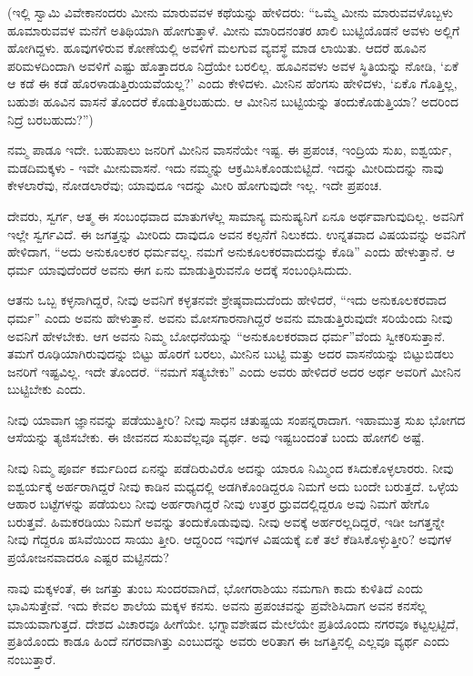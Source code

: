 (ಇಲ್ಲಿ ಸ್ವಾಮಿ ವಿವೇಕಾನಂದರು ಮೀನು ಮಾರುವವಳ ಕಥೆಯನ್ನು ಹೇಳಿದರು: “ಒಮ್ಮೆ ಮೀನು ಮಾರುವವಳೊಬ್ಬಳು ಹೂಮಾರುವವಳ ಮನೆಗೆ ಅತಿಥಿಯಾಗಿ ಹೋಗುತ್ತಾಳೆ. ಮೀನು ಮಾರಿದನಂತರ ಖಾಲಿ ಬುಟ್ಟಿಯೊಡನೆ ಅವಳು ಅಲ್ಲಿಗೆ ಹೋಗಿದ್ದಳು. ಹೂವುಗಳಿರುವ ಕೋಣೆಯಲ್ಲಿ ಅವಳಿಗೆ ಮಲಗುವ ವ್ಯವಸ್ಥೆ ಮಾಡ ಲಾಯಿತು. ಆದರೆ ಹೂವಿನ ಪರಿಮಳದಿಂದಾಗಿ ಅವಳಿಗೆ ಎಷ್ಟು ಹೊತ್ತಾದರೂ ನಿದ್ರೆಯೇ ಬರಲಿಲ್ಲ. ಹೂವಿನವಳು ಅವಳ ಸ್ಥಿತಿಯನ್ನು ನೋಡಿ, ‘ಏಕೆ ಆ ಕಡೆ ಈ ಕಡೆ ಹೊರಳಾಡುತ್ತಿರುಯವೆಯಲ್ಲ?’ ಎಂದು ಕೇಳಿದಳು. ಮೀನಿನ ಹೆಂಗಸು ಹೇಳಿದಳು, ‘ಏಕೊ ಗೊತ್ತಿಲ್ಲ, ಬಹುಶಃ ಹೂವಿನ ವಾಸನೆ ತೊಂದರೆ ಕೊಡುತ್ತಿರಬಹುದು. ಆ ಮೀನಿನ ಬುಟ್ಟಿಯನ್ನು ತಂದುಕೊಡುತ್ತಿಯಾ? ಅದರಿಂದ ನಿದ್ರೆ ಬರಬಹುದು?”)

ನಮ್ಮ ಪಾಡೂ ಇದೇ. ಬಹುಪಾಲು ಜನರಿಗೆ ಮೀನಿನ ವಾಸನೆಯೇ ಇಷ್ಟ. ಈ ಪ್ರಪಂಚ, ಇಂದ್ರಿಯ ಸುಖ, ಐಶ್ವರ್ಯ, ಮಡದಿಮಕ್ಕಳು - ಇವೇ ಮೀನುವಾಸನೆ. ಇದು ನಮ್ಮನ್ನು ಆಕ್ರಮಿಸಿಕೊಂಡುಬಿಟ್ಟಿದೆ. ಇದನ್ನು ಮೀರಿದುದನ್ನು ನಾವು ಕೇಳಲಾರೆವು, ನೋಡಲಾರೆವು; ಯಾವುದೂ ಇದನ್ನು ಮೀರಿ ಹೋಗುವುದೇ ಇಲ್ಲ. ಇದೇ ಪ್ರಪಂಚ.

ದೇವರು, ಸ್ವರ್ಗ, ಆತ್ಮ ಈ ಸಂಬಂಧವಾದ ಮಾತುಗಳೆಲ್ಲ ಸಾಮಾನ್ಯ ಮನುಷ್ಯನಿಗೆ ಏನೂ ಅರ್ಥವಾಗುವುದಿಲ್ಲ. ಅವನಿಗೆ ಇಲ್ಲೇ ಸ್ವರ್ಗವಿದೆ. ಈ ಜಗತ್ತನ್ನು ಮೀರಿದು ದಾವುದೂ ಅವನ ಕಲ್ಪನೆಗೆ ನಿಲುಕದು. ಉನ್ನತವಾದ ವಿಷಯವನ್ನು ಅವನಿಗೆ ಹೇಳಿದಾಗ, “ಅದು ಅನುಕೂಲಕರ ಧರ್ಮವಲ್ಲ. ನಮಗೆ ಅನುಕೂಲಕರವಾದುದನ್ನು ಕೊಡಿ” ಎಂದು ಹೇಳುತ್ತಾನೆ. ಆ ಧರ್ಮ ಯಾವುದೆಂದರೆ ಅವನು ಈಗ ಏನು ಮಾಡುತ್ತಿರುವನೊ ಅದಕ್ಕೆ ಸಂಬಂಧಿಸಿದುದು.

ಆತನು ಒಬ್ಬ ಕಳ್ಳನಾಗಿದ್ದರೆ, ನೀವು ಅವನಿಗೆ ಕಳ್ಳತನವೇ ಶ್ರೇಷ್ಠವಾದುದೆಂದು ಹೇಳಿದರೆ, “ಇದು ಅನುಕೂಲಕರವಾದ ಧರ್ಮ” ಎಂದು ಅವನು ಹೇಳುತ್ತಾನೆ. ಅವನು ಮೋಸಗಾರನಾಗಿದ್ದರೆ ಅವನು ಮಾಡುತ್ತಿರುವುದೇ ಸರಿಯೆಂದು ನೀವು ಅವನಿಗೆ ಹೇಳಬೇಕು. ಆಗ ಅವನು ನಿಮ್ಮ ಬೋಧನೆಯನ್ನು “ಅನುಕೂಲಕರವಾದ ಧರ್ಮ”ವೆಂದು ಸ್ವೀಕರಿಸುತ್ತಾನೆ. ತಮಗೆ ರೂಢಿಯಾಗಿರುವುದನ್ನು ಬಿಟ್ಟು ಹೊರಗೆ ಬರಲು, ಮೀನಿನ ಬುಟ್ಟಿ ಮತ್ತು ಅದರ ವಾಸನೆಯನ್ನು ಬಿಟ್ಟುಬಿಡಲು ಜನರಿಗೆ ಇಷ್ಟವಿಲ್ಲ. ಇದೇ ತೊಂದರೆ. “ನಮಗೆ ಸತ್ಯಬೇಕು” ಎಂದು ಅವರು ಹೇಳಿದರೆ ಅದರ ಅರ್ಥ ಅವರಿಗೆ ಮೀನಿನ ಬುಟ್ಟಿಬೇಕು ಎಂದು.

ನೀವು ಯಾವಾಗ ಜ್ಞಾನವನ್ನು ಪಡೆಯುತ್ತೀರಿ? ನೀವು ಸಾಧನ ಚತುಷ್ಟಯ ಸಂಪನ್ನರಾದಾಗ. ಇಹಾಮುತ್ರ ಸುಖ ಭೋಗದ ಆಸೆಯನ್ನು ತ್ಯಜಿಸಬೇಕು. ಈ ಜೀವನದ ಸುಖವೆಲ್ಲವೂ ವ್ಯರ್ಥ. ಅವು ಇಷ್ಟಬಂದಂತೆ ಬಂದು ಹೋಗಲಿ ಅಷ್ಟೆ.

ನೀವು ನಿಮ್ಮ ಪೂರ್ವ ಕರ್ಮದಿಂದ ಏನನ್ನು ಪಡೆದಿರುವಿರೊ ಅದನ್ನು ಯಾರೂ ನಿಮ್ಮಿಂದ ಕಸಿದುಕೊಳ್ಳಲಾರರು. ನೀವು ಐಶ್ವರ್ಯಕ್ಕೆ ಅರ್ಹರಾಗಿದ್ದರೆ ನೀವು ಕಾಡಿನ ಮಧ್ಯದಲ್ಲಿ ಅಡಗಿಕೊಂಡಿದ್ದರೂ ನಿಮಗೆ ಅದು ಬಂದೇ ಬರುತ್ತದೆ. ಒಳ್ಳೆಯ ಆಹಾರ ಬಟ್ಟೆಗಳನ್ನು ಪಡೆಯಲು ನೀವು ಅರ್ಹರಾಗಿದ್ದರೆ ನೀವು ಉತ್ತರ ಧ್ರುವದಲ್ಲಿದ್ದರೂ ಅವು ನಿಮಗೆ ಹೇಗೊ ಬರುತ್ತವೆ. ಹಿಮಕರಡಿಯು ನಿಮಗೆ ಅವನ್ನು ತಂದುಕೊಡುವುವು. ನೀವು ಅವಕ್ಕೆ ಅರ್ಹರಲ್ಲದಿದ್ದರೆ, ಇಡೀ ಜಗತ್ತನ್ನೇ ನೀವು ಗೆದ್ದರೂ ಹಸಿವೆಯಿಂದ ಸಾಯು ತ್ತೀರಿ. ಆದ್ದರಿಂದ ಇವುಗಳ ವಿಷಯಕ್ಕೆ ಏಕೆ ತಲೆ ಕೆಡಿಸಿಕೊಳ್ಳುತ್ತೀರಿ? ಅವುಗಳ ಪ್ರಯೋಜನವಾದರೂ ಎಷ್ಟರ ಮಟ್ಟಿನದು?

ನಾವು ಮಕ್ಕಳಂತೆ, ಈ ಜಗತ್ತು ತುಂಬ ಸುಂದರವಾಗಿದೆ, ಭೋಗರಾಶಿಯು ನಮಗಾಗಿ ಕಾದು ಕುಳಿತಿದೆ ಎಂದು ಭಾವಿಸುತ್ತೇವೆ. ಇದು ಕೇವಲ ಶಾಲೆಯ ಮಕ್ಕಳ ಕನಸು. ಅವನು ಪ್ರಪಂಚವನ್ನು ಪ್ರವೇಶಿಸಿದಾಗ ಅವನ ಕನಸೆಲ್ಲ ಮಾಯವಾಗುತ್ತದೆ. ದೇಶದ ವಿಚಾರವೂ ಹೀಗೆಯೇ. ಭಗ್ನಾವಶೇಷದ ಮೇಲೆಯೇ ಪ್ರತಿಯೊಂದು ನಗರವೂ ಕಟ್ಟಲ್ಪಟ್ಟಿದೆ, ಪ್ರತಿಯೊಂದು ಕಾಡೂ ಹಿಂದೆ ನಗರವಾಗಿತ್ತು ಎಂಬುದನ್ನು ಅವರು ಅರಿತಾಗ ಈ ಜಗತ್ತಿನಲ್ಲಿ ಎಲ್ಲವೂ ವ್ಯರ್ಥ ಎಂದು ನಂಬುತ್ತಾರೆ.

